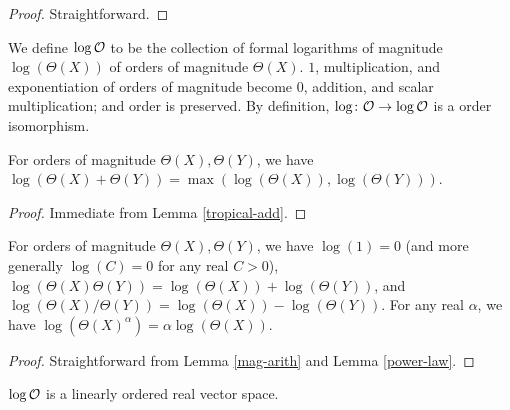 \begin{proof}\leanok Straightforward.
\end{proof}

\begin{definition} \label{log-order-def}\leanok  We define $\log {\mathcal O}$ to be the collection of formal logarithms of magnitude $\log(\Theta(X))$ of orders of magnitude $\Theta(X)$.  $1$, multiplication, and exponentiation of orders of magnitude become $0$, addition, and scalar multiplication; and order is preserved. By definition, $\log \colon {\mathcal O} \to \log {\mathcal O}$ is a order isomorphism.
\end{definition}


\begin{lemma}\label{log-add}\leanok  For orders of magnitude $\Theta(X), \Theta(Y)$, we have $\log(\Theta(X) + \Theta(Y)) = \max(\log(\Theta(X)), \log(\Theta(Y)))$.
\end{lemma}

\begin{proof}\leanok Immediate from Lemma \ref{tropical-add}.
\end{proof}

\begin{lemma}\label{log-mult}\leanok  For orders of magnitude $\Theta(X), \Theta(Y)$, we have $\log(1) = 0$ (and more generally $\log(C) = 0$ for any real $C>0$), $\log(\Theta(X) \Theta(Y)) = \log(\Theta(X)) + \log(\Theta(Y))$, and $\log(\Theta(X) / \Theta(Y)) = \log(\Theta(X)) - \log(\Theta(Y))$.  For any real $\alpha$, we have $\log(\Theta(X)^\alpha) = \alpha \log(\Theta(X))$.
\end{lemma}

\begin{proof}\leanok Straightforward from Lemma \ref{mag-arith} and Lemma \ref{power-law}.
\end{proof}


\begin{lemma}\label{ord-vec}\leanok $\log {\mathcal O}$ is a linearly ordered real vector space.
\end{lemma}

